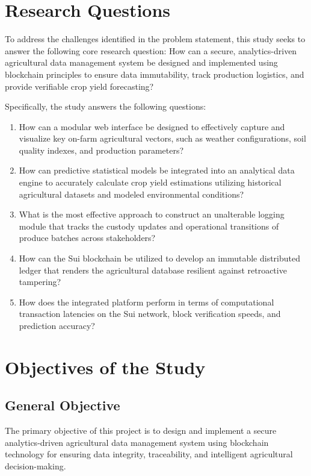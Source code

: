 \section{Research Questions}

To address the challenges identified in the problem statement, this study seeks to answer the following core research question: How can a secure, analytics-driven agricultural data management system be designed and implemented using blockchain principles to ensure data immutability, track production logistics, and provide verifiable crop yield forecasting?

Specifically, the study answers the following questions:
\begin{enumerate}
    \item How can a modular web interface be designed to effectively capture and visualize key on-farm agricultural vectors, such as weather configurations, soil quality indexes, and production parameters?
    \item How can predictive statistical models be integrated into an analytical data engine to accurately calculate crop yield estimations utilizing historical agricultural datasets and modeled environmental conditions?
    \item What is the most effective approach to construct an unalterable logging module that tracks the custody updates and operational transitions of produce batches across stakeholders?
    \item How can the Sui blockchain be utilized to develop an immutable distributed ledger that renders the agricultural database resilient against retroactive tampering?
    \item How does the integrated platform perform in terms of computational transaction latencies on the Sui network, block verification speeds, and prediction accuracy?
\end{enumerate}

\section{Objectives of the Study}

\subsection{General Objective}
The primary objective of this project is to design and implement a secure analytics-driven agricultural data management system using blockchain technology for ensuring data integrity, traceability, and intelligent agricultural decision-making.

